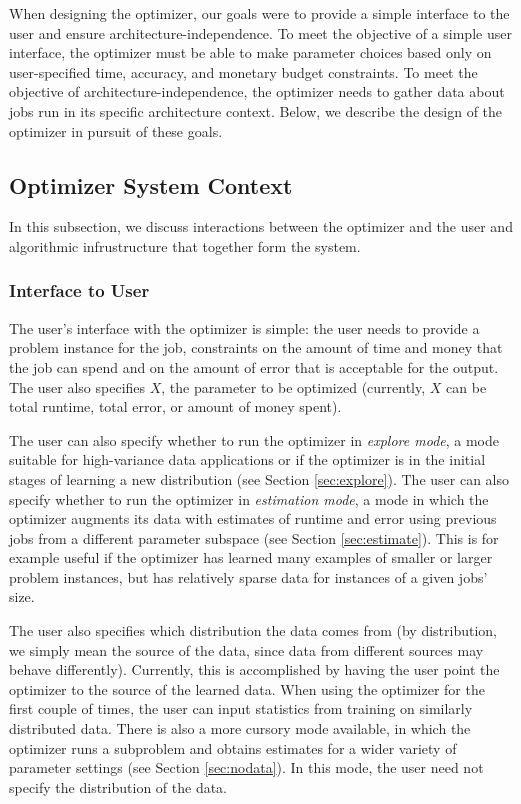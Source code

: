 
When designing the optimizer, our goals were to provide a simple 
interface to the user and ensure architecture-independence. To meet the
objective of a simple user interface, the optimizer must be able to
make parameter choices based only on user-specified time, accuracy, and
monetary budget constraints. To meet
the objective of architecture-independence, the optimizer needs to gather
data about jobs run in its specific architecture context. Below,
we describe the design of the optimizer in pursuit of these goals. 


\subsection{Optimizer System Context}

In this subsection, we discuss interactions between the optimizer and 
the user and algorithmic infrustructure that together form the system. 

\subsubsection{Interface to User}
The user's interface with the optimizer is simple: the user needs to
provide a problem instance for the job, constraints on the amount of
time and money that the job can spend and on the amount of error
that is acceptable for the output. The user also specifies $X$, the 
parameter to be optimized (currently, $X$ can be total runtime, total
error, or amount of money spent).

The user can also specify whether to run the optimizer in {\em explore 
mode}, a mode suitable for high-variance data applications or if the 
optimizer is in the initial stages of learning a new 
distribution (see Section \ref{sec:explore}). The user can also specify
whether to run the optimizer in {\em estimation mode}, a mode in which
the optimizer augments its data with estimates of runtime and error 
using previous jobs from a different parameter 
subspace (see Section \ref{sec:estimate}). This is for example useful 
if the optimizer has learned many examples of
smaller or larger problem instances, but has relatively sparse data
for instances of a given jobs' size. 

The user also specifies which distribution the data comes from (by
distribution, we simply mean the source of the data, since data from
different sources may behave differently). Currently,
this is accomplished by having the user point the optimizer to the 
source of the learned data. When using the optimizer for the first 
couple of times, the user can input statistics from training on similarly
distributed data. There is also a more cursory mode available, in which
the optimizer runs a subproblem and obtains estimates for a wider 
variety of parameter settings (see Section \ref{sec:nodata}). In this 
mode, the user need not specify the distribution of the data. 

